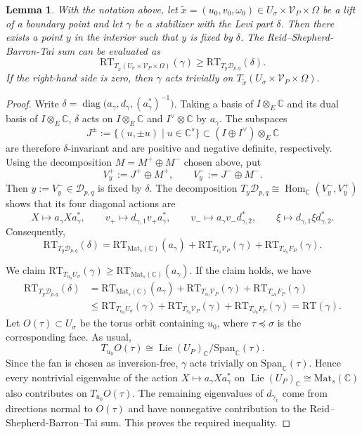 \documentclass[11pt]{amsart}
\theoremstyle{plain}
\newtheorem{lem}[thm]{Lemma}
\theoremstyle{definition}
\numberwithin{equation}{section}
\def\Lie{\mathop{\mathrm{Lie}}\nolimits}
\def\diag{\mathop{\mathrm{diag}}\nolimits}
\newcommand{\bbC}{\mathbb{C}}
\newcommand{\calD}{\mathcal{D}}
\newcommand{\Mat}{\mathrm{Mat}}
\begin{document}
\begin{lem}
\label{lem:boundary-interior-comparison}
    With the notation above, let $\widetilde{x}=(u_0,v_0,\omega_0)
\in U_\sigma\times\mathcal V_P\times\Omega$
be a lift of a boundary point and let $\gamma$ be a stabilizer with the Levi part $\delta$. Then there exists a point $y$ in the interior such that $y$ is fixed by $\delta$.
The Reid--Shepherd-Barron-Tai sum can be evaluated as
\[
\mathrm{RT}_{T_{\widetilde{x}}
(U_\sigma\times\mathcal V_P\times\Omega)}(\gamma)
\geq
\mathrm{RT}_{T_y\calD_{p,q}}(\delta).
\]
If the right-hand side is zero, then $\gamma$ acts trivially on
$T_{\widetilde{x}}
(U_\sigma\times\mathcal V_P\times\Omega)$.
\end{lem}
\begin{proof}
Write $\delta=
\diag\bigl(a_\gamma,d_\gamma,(a_\gamma^*)^{-1}\bigr)$.
Taking a basis of $I \otimes_E \bbC$ and its dual basis of $I \otimes_E \bbC$, $\delta$ acts on $I \otimes_E \bbC$ and $I^\vee \otimes \bbC$ by $a_\gamma$.
The subspaces
\[
J^\pm:=\{(u,\pm u)\mid u\in\bbC^s\}
\subset (I\oplus I^\vee)\otimes_E\bbC
\]
are therefore $\delta$-invariant and are positive and negative
definite, respectively.
Using the decomposition $M=M^+\oplus M^-$ chosen above, put
\[
V_y^+:=J^+\oplus M^+,\qquad
V_y^-:=J^-\oplus M^-.
\]
Then $y:=V_y^-\in\mathcal D_{p,q}$ is fixed by $\delta$.
The decomposition $T_y\mathcal D_{p,q}
\cong\operatorname{Hom}_{\bbC}(V_y^-,V_y^+)$
shows that its four diagonal actions are
\[
X\mapsto a_\gamma Xa_\gamma^*,\qquad
v_+\mapsto d_{\gamma,1}v_+a_\gamma^*,\qquad
v_-\mapsto a_\gamma v_-d_{\gamma,2}^*,\qquad
\xi\mapsto d_{\gamma,1}\xi d_{\gamma,2}^*.
\]
Consequently,
\[
\mathrm{RT}_{T_y\mathcal D_{p,q}}(\delta)
=
\mathrm{RT}_{\Mat_s(\bbC)}(a_\gamma)
+\mathrm{RT}_{T_{v_0}\mathcal V_P}(\gamma)
+\mathrm{RT}_{T_{\omega_0}F_P}(\gamma).
\]


We claim $\mathrm{RT}_{T_{u_0}U_\sigma}(\gamma) \geq \mathrm{RT}_{\Mat_s(\bbC)}(a_\gamma)$.
If the claim holds, we have
\begin{align*}
\mathrm{RT}_{T_y\mathcal D_{p,q}}(\delta)
&=
\mathrm{RT}_{\Mat_s(\bbC)}(a_\gamma)
+\mathrm{RT}_{T_{v_0}\mathcal V_P}(\gamma)
+\mathrm{RT}_{T_{\omega_0}F_P}(\gamma)\\
&\leq 
\mathrm{RT}_{T_{u_0}U_\sigma}(\gamma)
+\mathrm{RT}_{T_{v_0}\mathcal V_P}(\gamma)
+\mathrm{RT}_{T_{\omega_0}F_P}(\gamma)
= 
\mathrm{RT}(\gamma).
\end{align*}
Let $O(\tau)\subset U_\sigma$ be the torus orbit containing $u_0$,
where $\tau\preceq\sigma$ is the corresponding face. As usual,
\[
T_{u_0}O(\tau)
\cong
\Lie(U_P)_{\bbC}/\mathrm{Span}_{\bbC}(\tau).
\]
Since the fan is chosen as inversion-free, $\gamma$
acts trivially on $\mathrm{Span}_{\bbC}(\tau)$. Hence every nontrivial
eigenvalue of the action
$X\mapsto a_\gamma Xa_\gamma^*$ on
$\Lie(U_P)_{\bbC}\cong\Mat_s(\bbC)$ also contributes on
$T_{u_0}O(\tau)$. The remaining eigenvalues of $d_{\gamma_{\widetilde{x}}}$
come from directions normal to $O(\tau)$ and have
nonnegative contribution to the Reid--Shepherd-Barron--Tai sum. This proves the required
inequality. 


\end{proof}
\end{document}
